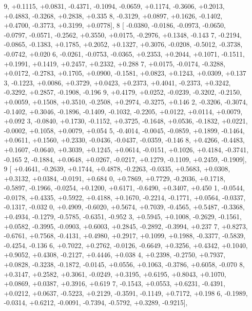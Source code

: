 \begin{DoxyCode}
      9, +0.1115, +0.0831, -0.4371, -0.1094, -0.0659, +0.1174, -0.3606, +0.2013, +0.4883, -0.3268, +0.2838, +0.335
      8, -0.3129, +0.0897, +0.1626, -0.1402, +0.4700, -0.3773, +0.3199, +0.0778],
8 [ -0.0380, -0.0186, -0.0973, -0.0650, -0.0797, -0.0571, -0.2562, +0.3550, +0.0175, -0.2976, +0.1348, -0.143
      7, -0.2194, -0.0865, -0.1383, +0.1785, +0.2052, +0.1327, +0.3076, -0.0208, -0.5012, -0.3738, -0.0742, +0.020
      6, -0.0261, -0.0753, -0.0365, +0.2353, +0.2044, +0.1071, -0.1511, +0.1991, +0.1419, +0.2457, +0.2332, +0.288
      7, +0.0175, -0.0174, -0.3288, +0.0172, -0.2783, +0.1705, +0.0900, -0.1581, +0.0823, +0.1243, +0.0309, +0.137
      3, -0.1223, +0.0086, +0.3729, +0.0423, +0.2373, +0.4041, -0.2373, +0.3242, -0.3292, +0.2857, -0.1908, -0.196
      9, +0.4179, +0.0252, -0.0239, -0.3202, -0.2150, +0.0059, +0.1508, +0.3510, -0.2508, +0.2974, -0.3275, +0.146
      2, -0.3206, -0.3074, -0.1402, +0.3046, -0.1896, -0.1409, -0.1032, -0.2205, +0.0122, +0.0114, +0.0079, +0.092
      3, -0.0840, +0.1730, -0.1152, +0.3725, -0.1648, +0.0536, -0.1832, +0.0221, -0.0002, +0.1058, +0.0079, +0.054
      5, -0.4014, -0.0045, -0.0859, +0.1899, -0.1464, +0.0611, +0.1560, +0.2330, -0.0436, -0.0437, -0.0359, -0.146
      8, +0.4266, -0.4483, +0.1607, -0.0640, +0.3039, +0.1245, +0.0614, -0.0151, +0.1026, +0.4184, -0.3741, -0.165
      2, -0.1884, +0.0648, +0.0267, -0.0217, +0.1279, -0.1109, +0.2459, -0.1909],
9 [ +0.4641, -0.2639, +0.1744, +0.4878, -0.2263, -0.0335, +0.5683, +0.0308, +0.3132, +0.0384, -0.0191, +0.684
      0, +0.7869, +0.7729, -0.2036, +0.1718, -0.5897, -0.1966, -0.0254, +0.1200, +0.6171, -0.6490, +0.3407, +0.450
      1, -0.0544, -0.0178, +0.4335, +0.5922, +0.4188, +0.1670, -0.2214, -0.1771, +0.0564, -0.0337, -0.1317, -0.032
      0, +0.4909, -0.6020, +0.5674, +0.7039, -0.4565, +0.5487, -0.3368, +0.4934, -0.1279, -0.5785, -0.6351, -0.952
      3, +0.5945, +0.1008, -0.2629, -0.1561, +0.0582, -0.3995, -0.0903, +0.6003, +0.2845, -0.2892, -0.3994, +0.237
      7, +0.8273, -0.6761, +0.7568, -0.4131, +0.4980, +0.2917, +0.1099, +0.1988, -0.3377, -0.5839, -0.4254, -0.136
      6, +0.7022, +0.2762, -0.0126, -0.6649, +0.3256, +0.4342, +0.1040, +0.9052, +0.4308, -0.2127, +0.4446, +0.038
      4, +0.2398, -0.2750, +0.7937, +0.0828, -0.3238, -0.1872, -0.0145, +0.0556, +0.1063, -0.3786, +0.6058, -0.070
      8, +0.3147, +0.2582, +0.3061, -0.0249, +0.3195, +0.6195, +0.8043, +0.1070, +0.0869, +0.0387, +0.3916, +0.619
      7, -0.1543, +0.0553, +0.6231, -0.4391, +0.0212, +0.0637, -0.5223, +0.2129, -0.3591, -0.1149, +0.7172, +0.198
      6, -0.1989, -0.0314, +0.6212, -0.0091, -0.7394, -0.5792, +0.3289, -0.9215],

\end{DoxyCode}
